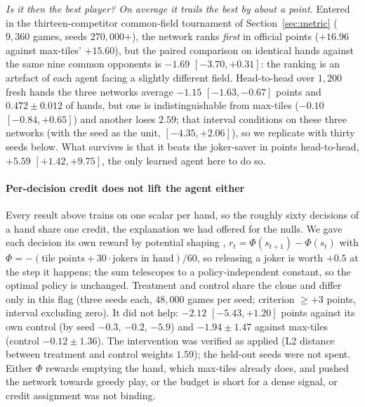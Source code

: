 \documentclass[10pt,journal,compsoc]{IEEEtran}
\begin{document}
\emph{Is it then the best player? On average it trails the best by about a point.} Entered in the thirteen-competitor common-field tournament of Section~\ref{sec:metric} ($9{,}360$ games, seeds $270{,}000$+), the network ranks \emph{first} in official points ($+16.96$ against max-tiles' $+15.60$), but the paired comparison on identical hands against the same nine common opponents is $-1.69$ $[-3.70,+0.31]$: the ranking is an artefact of each agent facing a slightly different field. Head-to-head over $1{,}200$ fresh hands the three networks average $-1.15$ $[-1.63,-0.67]$ points and $0.472\pm0.012$ of hands, but one is indistinguishable from max-tiles ($-0.10$ $[-0.84,+0.65]$) and another loses $2.59$; that interval conditions on these three networks (with the seed as the unit, $[-4.35,+2.06]$), so we replicate with thirty seeds below. What survives is that it beats the joker-saver in points head-to-head, $+5.59$ $[+1.42,+9.75]$, the only learned agent here to do so.

\paragraph*{Per-decision credit does not lift the agent either}\label{sec:passo}
Every result above trains on one scalar per hand, so the roughly sixty decisions of a hand share one credit, the explanation we had offered for the nulls. We gave each decision its own reward by potential shaping \cite{ng1999}, $r_t=\Phi(s_{t+1})-\Phi(s_t)$ with $\Phi=-(\text{tile points}+30\cdot\text{jokers in hand})/60$, so releasing a joker is worth $+0.5$ at the step it happens; the sum telescopes to a policy-independent constant, so the optimal policy is unchanged. Treatment and control share the clone and differ only in this flag (three seeds each, $48{,}000$ games per seed; criterion $\ge+3$ points, interval excluding zero). It did not help: $-2.12$ $[-5.43,+1.20]$ points against its own control (by seed $-0.3$, $-0.2$, $-5.9$) and $-1.94\pm1.47$ against max-tiles (control $-0.12\pm1.36$). The intervention was verified as applied (L2 distance between treatment and control weights $1.59$); the held-out seeds were not spent. Either $\Phi$ rewards emptying the hand, which max-tiles already does, and pushed the network towards greedy play, or the budget is short for a dense signal, or credit assignment was not binding.
\end{document}
